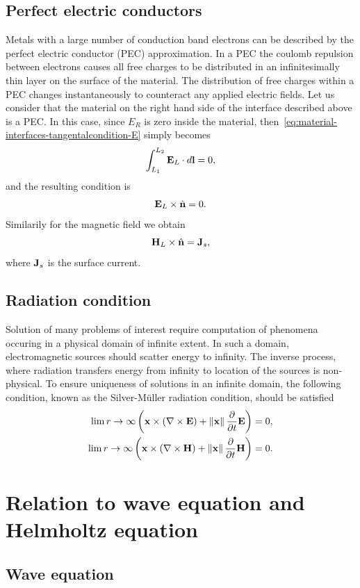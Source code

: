 \subsection{Perfect electric conductors}
Metals with a large number of conduction band electrons can be described by the
perfect electric conductor (PEC) approximation. In a PEC the coulomb repulsion
between electrons causes all free charges to be distributed in an
infinitesimally thin layer on the surface of the material. The distribution of
free charges within a PEC changes instantaneously to counteract any applied
electric fields. Let us consider that the material on the right hand side of the
interface described above is a PEC. In this case, since $E_R$ is zero inside the
material, then~\eqref{eq:material-interfaces-tangentalcondition-E} simply
becomes
$$
\int_{L_1}^{L_2} \mathbf{E}_L \cdot d\mathbf{l} = 0 ,
$$
and the resulting condition is
$$
\mathbf{E}_L \times \hat{\mathbf{n}} = 0 .
$$
Similarily for the magnetic field we obtain
$$
\mathbf{H}_L \times \hat{\mathbf{n}} = \mathbf{J}_s ,
$$
where $\mathbf{J}_s$ is the surface current.

\subsection{Radiation condition}
Solution of many problems of interest require computation of phenomena occuring in a physical domain of infinite extent. In such a domain, electromagnetic sources should scatter energy to infinity. The inverse process, where radiation transfers energy from infinity to location of the sources is non-physical. To ensure uniqueness of solutions in an infinite domain, the following condition, known as the Silver-M\"uller radiation condition, should be satisfied
\begin{align}
\lim{ r \to \infty } \left( \mathbf{x} \times \left( \nabla \times \mathbf{E} \right) + \left\lVert\mathbf{x}\right\rVert \frac{\partial}{\partial t} \mathbf{E} \right) = 0, \\
\lim{ r \to \infty } \left( \mathbf{x} \times \left( \nabla \times \mathbf{H} \right) + \left\lVert\mathbf{x}\right\rVert \frac{\partial}{\partial t} \mathbf{H} \right) = 0.
\end{align}

\section{Relation to wave equation and Helmholtz equation}
\subsection{Wave equation}

